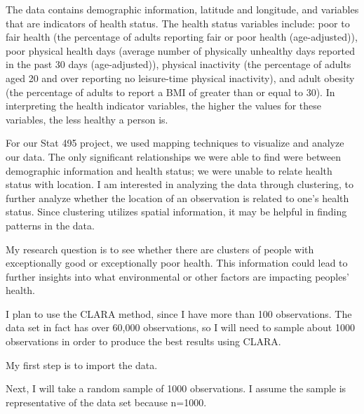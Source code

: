 \documentclass[12pt,twoside]{amherstthesis}
\begin{document}
  The data contains demographic information, latitude and longitude, and
  variables that are indicators of health status. The health status
  variables include: poor to fair health (the percentage of adults
  reporting fair or poor health (age-adjusted)), poor physical health days
  (average number of physically unhealthy days reported in the past 30
  days (age-adjusted)), physical inactivity (the percentage of adults aged
  20 and over reporting no leisure-time physical inactivity), and adult
  obesity (the percentage of adults to report a BMI of greater than or
  equal to 30). In interpreting the health indicator variables, the higher
  the values for these variables, the less healthy a person is.
  
  For our Stat 495 project, we used mapping techniques to visualize and
  analyze our data. The only significant relationships we were able to
  find were between demographic information and health status; we were
  unable to relate health status with location. I am interested in
  analyzing the data through clustering, to further analyze whether the
  location of an observation is related to one's health status. Since
  clustering utilizes spatial information, it may be helpful in finding
  patterns in the data.
  
  My research question is to see whether there are clusters of people with
  exceptionally good or exceptionally poor health. This information could
  lead to further insights into what environmental or other factors are
  impacting peoples' health.
  
  I plan to use the CLARA method, since I have more than 100 observations.
  The data set in fact has over 60,000 observations, so I will need to
  sample about 1000 observations in order to produce the best results
  using CLARA.
  
  My first step is to import the data.
  
  Next, I will take a random sample of 1000 observations. I assume the
  sample is representative of the data set because n=1000.
  
  \begin{Shaded}
  \begin{Highlighting}[]
  \NormalTok{(}\NormalTok{)}
  \StringTok{ }\NormalTok{data_subset[}\NormalTok{(}\OperatorTok{:}\NormalTok{,}
     \NormalTok{),]}
  \end{Highlighting}
  \end{Shaded}
  
\end{document}
